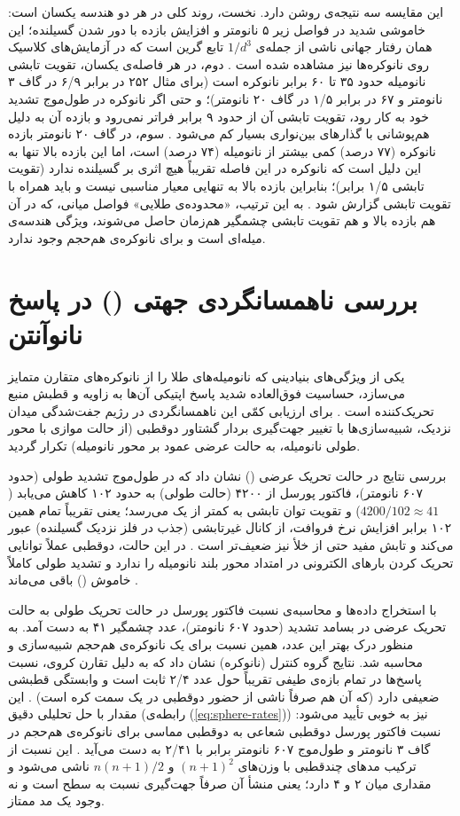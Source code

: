 \documentclass[12pt,a4paper]{report}
\begin{document}
این مقایسه سه نتیجه‌ی روشن دارد. نخست، روند کلی در هر دو هندسه یکسان است: خاموشی شدید در فواصل زیر ۵ نانومتر و افزایش بازده با دور شدن گسیلنده؛ این همان رفتار جهانی ناشی از جمله‌ی $1/d^3$ تابع گرین است که در آزمایش‌های کلاسیک روی نانوکره‌ها نیز مشاهده شده است \cite{anger,kuhn}. دوم، در هر فاصله‌ی یکسان، تقویت تابشی نانومیله حدود ۳۵ تا ۶۰ برابر نانوکره است (برای مثال ۲۵۲ در برابر ۶/۹ در گاف ۳ نانومتر و ۶۷ در برابر ۱/۵ در گاف ۲۰ نانومتر)؛ و حتی اگر نانوکره در طول‌موج تشدید خود به کار رود، تقویت تابشی آن از حدود ۹ برابر فراتر نمی‌رود و بازده آن به دلیل هم‌پوشانی با گذارهای بین‌نواری بسیار کم می‌شود \cite{sonnichsen,link}. سوم، در گاف ۲۰ نانومتر بازده نانوکره (۷۷ درصد) کمی بیشتر از نانومیله (۷۴ درصد) است، اما این بازده بالا تنها به این دلیل است که نانوکره در این فاصله تقریباً هیچ اثری بر گسیلنده ندارد (تقویت تابشی ۱/۵ برابر)؛ بنابراین بازده بالا به تنهایی معیار مناسبی نیست و باید همراه با تقویت تابشی گزارش شود \cite{koenderink}. به این ترتیب، «محدوده‌ی طلایی» فواصل میانی، که در آن هم بازده بالا و هم تقویت تابشی چشمگیر هم‌زمان حاصل می‌شوند، ویژگی هندسه‌ی میله‌ای است و برای نانوکره‌ی هم‌حجم وجود ندارد.

\section{بررسی ناهمسانگردی جهتی () در پاسخ نانوآنتن}
یکی از ویژگی‌های بنیادینی که نانومیله‌های طلا را از نانوکره‌های متقارن متمایز می‌سازد، حساسیت فوق‌العاده شدید پاسخ اپتیکی آن‌ها به زاویه و قطبش منبع تحریک‌کننده است \cite{maier,novotny}. برای ارزیابی کمّی این ناهمسانگردی در رژیم جفت‌شدگی میدان نزدیک، شبیه‌سازی‌ها با تغییر جهت‌گیری بردار گشتاور دوقطبی (از حالت موازی با محور طولی نانومیله، به حالت عرضی عمود بر محور نانومیله) تکرار گردید.

بررسی نتایج در حالت تحریک عرضی () نشان داد که در طول‌موج تشدید طولی (حدود ۶۰۷ نانومتر)، فاکتور پورسل از ۴۲۰۰ (حالت طولی) به حدود ۱۰۲ کاهش می‌یابد ($4200/102\approx41$) و تقویت توان تابشی به کمتر از یک می‌رسد؛ یعنی تقریباً تمام همین ۱۰۲ برابر افزایش نرخ فروافت، از کانال غیرتابشی (جذب در فلز نزدیک گسیلنده) عبور می‌کند و تابش مفید حتی از خلأ نیز ضعیف‌تر است \cite{novotny,maier}. در این حالت، دوقطبی عملاً توانایی تحریک کردن بارهای الکترونی در امتداد محور بلند نانومیله را ندارد و تشدید طولی کاملاً خاموش () باقی می‌ماند \cite{maier}.

با استخراج داده‌ها و محاسبه‌ی نسبت فاکتور پورسل در حالت تحریک طولی به حالت تحریک عرضی در بسامد تشدید (حدود ۶۰۷ نانومتر)، عدد چشمگیر ۴۱ به دست آمد. به منظور درک بهتر این عدد، همین نسبت برای یک نانوکره‌ی هم‌حجم شبیه‌سازی و محاسبه شد. نتایج گروه کنترل (نانوکره) نشان داد که به دلیل تقارن کروی، نسبت پاسخ‌ها در تمام بازه‌ی طیفی تقریباً حول عدد ۲/۴ ثابت است و وابستگی قطبشی ضعیفی دارد (که آن هم صرفاً ناشی از حضور دوقطبی در یک سمت کره است) \cite{novotny,maier}. این مقدار با حل تحلیلی دقیق (رابطه‌ی (\ref{eq:sphere-rates})) نیز به خوبی تأیید می‌شود: نسبت فاکتور پورسل دوقطبی شعاعی به دوقطبی مماسی برای نانوکره‌ی هم‌حجم در گاف ۳ نانومتر و طول‌موج ۶۰۷ نانومتر برابر با ۲/۴۱ به دست می‌آید \cite{ruppin}. این نسبت از ترکیب مدهای چندقطبی با وزن‌های $(n+1)^2$ و $n(n+1)/2$ ناشی می‌شود و مقداری میان ۲ و ۴ دارد؛ یعنی منشأ آن صرفاً جهت‌گیری نسبت به سطح است و نه وجود یک مد ممتاز.
\end{document}
